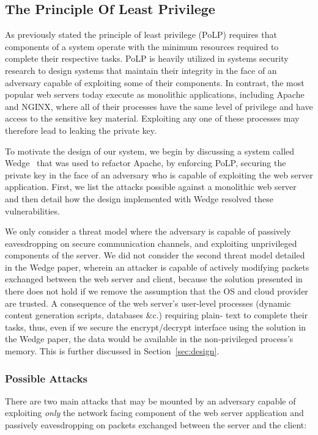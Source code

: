 \documentclass[../main.tex]{subfiles}
\begin{document}
\subsection{The Principle Of Least Privilege}

As previously stated the principle of least privilege (PoLP) requires
that components of a system operate with the minimum resources
required to complete their respective tasks. PoLP is heavily utilized
in systems security research to design systems that maintain their
integrity in the face of an adversary capable of exploiting some of
their components. In contrast, the most popular web servers today
execute as monolithic applications, including Apache and NGINX, where
all of their processes have the same level of privilege and have
access to the sensitive key material. Exploiting any one of these
processes may therefore lead to leaking the private key.

To motivate the design of our system, we begin by discussing a system
called Wedge~\cite{Bittau08} that was used to refactor Apache, by
enforcing PoLP, securing the private key in the face of an adversary
who is capable of exploiting the web server application. First, we
list the attacks possible against a monolithic web server and then
detail how the design implemented with Wedge resolved these
vulnerabilities.

We only consider a threat model where the adversary is capable of
passively eavesdropping on secure communication channels, and
exploiting unprivileged components of the server. We did not consider
the second threat model detailed in the Wedge paper, wherein an
attacker is capable of actively modifying packets exchanged between
the web server and client, because the solution presented in there
does not hold if we remove the assumption that the OS and cloud
provider are trusted. A consequence of the web server's user-level
processes (dynamic content generation scripts, databases \&c.)
requiring plain- text to complete their tasks, thus, even if we secure
the encrypt/decrypt interface using the solution in the Wedge paper,
the data would be available in the non-privileged process's
memory. This is further discussed in Section~\ref{sec:design}.

\subsubsection*{Possible Attacks}

There are two main attacks that may be mounted by an adversary capable
of exploiting \textit{only} the network facing component of the web
server application and passively eavesdropping on packets exchanged
between the server and the client:
\end{document}
